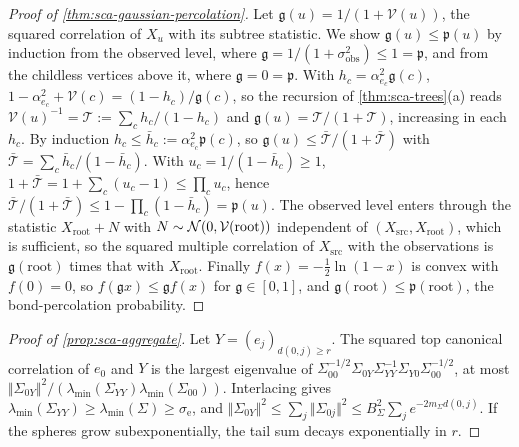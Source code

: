 \begin{proof}[Proof of \cref{thm:sca-gaussian-percolation}]
Let $\mathfrak g(u)=1/(1+\mathcal V(u))$, the squared correlation of $X_u$ with its subtree statistic. We show $\mathfrak g(u)\le\mathfrak p(u)$ by induction from the observed level, where $\mathfrak g=1/(1+\sigma_{\mathrm{obs}}^2)\le1=\mathfrak p$, and from the childless vertices above it, where $\mathfrak g=0=\mathfrak p$. With $h_c=\alpha_{e_c}^2\mathfrak g(c)$, $1-\alpha_{e_c}^2+\mathcal V(c)=(1-h_c)/\mathfrak g(c)$, so the recursion of \cref{thm:sca-trees}(a) reads $\mathcal V(u)^{-1}=\mathcal T:=\sum_ch_c/(1-h_c)$ and $\mathfrak g(u)=\mathcal T/(1+\mathcal T)$, increasing in each $h_c$. By induction $h_c\le\bar h_c:=\alpha_{e_c}^2\mathfrak p(c)$, so $\mathfrak g(u)\le\bar{\mathcal T}/(1+\bar{\mathcal T})$ with $\bar{\mathcal T}=\sum_c\bar h_c/(1-\bar h_c)$. With $u_c=1/(1-\bar h_c)\ge1$, $1+\bar{\mathcal T}=1+\sum_c(u_c-1)\le\prod_cu_c$, hence $\bar{\mathcal T}/(1+\bar{\mathcal T})\le1-\prod_c(1-\bar h_c)=\mathfrak p(u)$. The observed level enters through the statistic $X_{\mathrm{root}}+N$ with $N\sim\mathcal{N}(0,\mathcal V(\mathrm{root}))$ independent of $(X_{\mathrm{src}},X_{\mathrm{root}})$, which is sufficient, so the squared multiple correlation of $X_{\mathrm{src}}$ with the observations is $\mathfrak g(\mathrm{root})$ times that with $X_{\mathrm{root}}$. Finally $f(x)=-\frac12\ln(1-x)$ is convex with $f(0)=0$, so $f(\mathfrak gx)\le\mathfrak gf(x)$ for $\mathfrak g\in[0,1]$, and $\mathfrak g(\mathrm{root})\le\mathfrak p(\mathrm{root})$, the bond-percolation probability.
\end{proof}

\begin{proof}[Proof of \cref{prop:sca-aggregate}]
Let $Y=(e_j)_{d(0,j)\ge r}$. The squared top canonical correlation of $e_0$ and $Y$ is the largest eigenvalue of $\Sigma_{00}^{-1/2}\Sigma_{0Y}\Sigma_{YY}^{-1}\Sigma_{Y0}\Sigma_{00}^{-1/2}$, at most $\Vert\Sigma_{0Y}\Vert^2/(\lambda_{\min}(\Sigma_{YY})\lambda_{\min}(\Sigma_{00}))$. Interlacing gives $\lambda_{\min}(\Sigma_{YY})\ge\lambda_{\min}(\Sigma)\ge\sigma_{\mathrm e}$, and $\Vert\Sigma_{0Y}\Vert^2\le\sum_j\Vert\Sigma_{0j}\Vert^2\le B_\Sigma^2\sum_je^{-2m_\Sigma d(0,j)}$. If the spheres grow subexponentially, the tail sum decays exponentially in $r$.
\end{proof}

